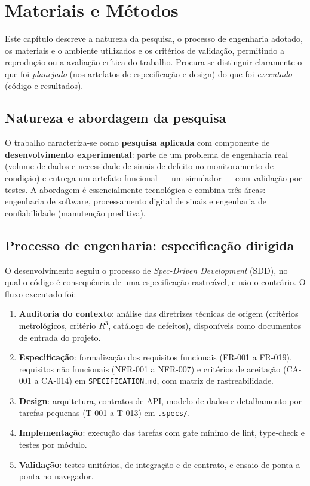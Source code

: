 \chapter{Materiais e Métodos}
\label{cap:metodologia}

Este capítulo descreve a natureza da pesquisa, o processo de engenharia
adotado, os materiais e o ambiente utilizados e os critérios de validação,
permitindo a reprodução ou a avaliação crítica do trabalho. Procura-se
distinguir claramente o que foi \emph{planejado} (nos artefatos de
especificação e design) do que foi \emph{executado} (código e resultados).

\section{Natureza e abordagem da pesquisa}

O trabalho caracteriza-se como \textbf{pesquisa aplicada} com componente de
\textbf{desenvolvimento experimental}: parte de um problema de engenharia real
(volume de dados e necessidade de sinais de defeito no monitoramento de
condição) e entrega um artefato funcional --- um simulador --- com validação
por testes. A abordagem é essencialmente tecnológica e combina três áreas:
engenharia de software, processamento digital de sinais e engenharia de
confiabilidade (manutenção preditiva).

\section{Processo de engenharia: especificação dirigida}

O desenvolvimento seguiu o processo de \emph{Spec-Driven Development} (SDD),
no qual o código é consequência de uma especificação rastreável, e não o
contrário. O fluxo executado foi:

\begin{enumerate}
  \item \textbf{Auditoria do contexto}: análise das diretrizes técnicas de
  origem (critérios metrológicos, critério \(R^3\), catálogo de defeitos),
  disponíveis como documentos de entrada do projeto.
  \item \textbf{Especificação}: formalização dos requisitos funcionais
  (FR-001 a FR-019), requisitos não funcionais (NFR-001 a NFR-007) e critérios
  de aceitação (CA-001 a CA-014) em \texttt{SPECIFICATION.md}, com matriz de
  rastreabilidade.
  \item \textbf{Design}: arquitetura, contratos de API, modelo de dados e
  detalhamento por tarefas pequenas (T-001 a T-013) em \texttt{.specs/}.
  \item \textbf{Implementação}: execução das tarefas com gate mínimo de
  lint, type-check e testes por módulo.
  \item \textbf{Validação}: testes unitários, de integração e de contrato, e
  ensaio de ponta a ponta no navegador.
\end{enumerate}

